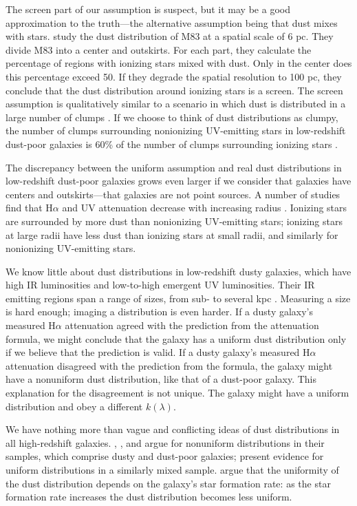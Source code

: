 \documentclass[preprint]{aastex}
\begin{document}
The screen part of our assumption is suspect, but it may be a
good approximation to the truth---the alternative assumption being that dust
mixes with stars.  \citet{liu13} study the dust distribution of M83 at a
spatial scale of 6 pc.  They divide M83 into a center and outskirts.  For each
part, they calculate the percentage of regions with ionizing stars mixed with
dust.  Only in the center does this percentage exceed 50.  If they degrade the
spatial resolution to 100 pc, they conclude that the dust distribution around
ionizing stars is a screen.  The screen assumption is qualitatively similar to
a scenario in which dust is distributed in a large number of clumps
\citep{calzetti94}.  If we choose to think of dust distributions as clumpy, the
number of clumps surrounding nonionizing UV-emitting stars in low-redshift
dust-poor galaxies is 60\% of the number of clumps surrounding ionizing stars
\citep{calzetti97a}.

The discrepancy between the uniform assumption and real dust
distributions in low-redshift dust-poor galaxies grows even larger if we
consider that galaxies have centers and outskirts---that galaxies are not
point sources.  A number of studies find
that H$\alpha$ and UV attenuation decrease with increasing radius
\citep{boissier04,prescott07,munoz09}.  Ionizing stars are surrounded by more
dust than nonionizing UV-emitting stars; ionizing stars
at large radii have less dust than ionizing stars at small radii, and similarly
for nonionizing UV-emitting stars.

We know little about dust distributions in low-redshift dusty galaxies, which
have high IR luminosities and low-to-high emergent UV luminosities.  Their
IR emitting regions span a range of sizes, from sub- to several kpc
\citep{diaz10}.  Measuring a size is hard enough; imaging a distribution is
even harder.  If a dusty galaxy's measured H$\alpha$ attenuation agreed with
the prediction from the \citet{calzetti00} attenuation formula, we might
conclude that the galaxy has a uniform dust distribution only if we believe
that the prediction is valid.  If a dusty galaxy's measured H$\alpha$
attenuation disagreed with the prediction from the \citet{calzetti00}
formula, the galaxy might have a nonuniform dust distribution, like that of a
dust-poor galaxy.  This explanation for the disagreement is not unique.  The
galaxy might have a uniform distribution and obey a different $k(\lambda)$.

We have nothing more than vague and conflicting ideas of dust distributions in
all high-redshift galaxies.  \citet{onodera10}, \citet{kashino13}, and 
\citet{price13} argue for nonuniform distributions in their samples, which
comprise dusty and dust-poor galaxies; \citet{erb06} present evidence for
uniform distributions in a similarly mixed sample.  \citet{reddy15} argue
that the uniformity of the dust distribution depends on the galaxy's
star formation rate: as the star formation rate increases the dust distribution
becomes less uniform.
\end{document}
